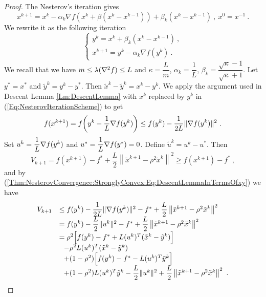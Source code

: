 \begin{proof} The Nesterov's iteration gives
$$x^{k+1} = x^k -
\alpha_k \nabla f
\left(x^k + \beta (x^k-x^{k-1})
\right)
+
\beta_k(x^k-x^{k-1}) \ , \ x^0=x^{-1} \ .
$$
We rewrite it as the following iteration
$$
\left\{\begin{array}{l}
y^k = x^k + \beta_k (x^k-x^{k-1}) \ , \\
x^{k+1} = y^k - \alpha_k \nabla f(y^k) \ .
\end{array}\right.
$$
We recall that we have $
m \le \lambda(\nabla^2 f) \le L$ and $\kappa = \dfrac{L}{m}$, $\alpha_k = \dfrac{1}{L}$, $\beta_k = \dfrac{\sqrt{\kappa}-1}{\sqrt{\kappa}+1}
$. Let $y^*=x^*$ and $\widetilde{y}^k= y^k-y^*$. Then $\widetilde{x}^k-\widetilde{y}^k=x^k-y^k$. We apply the argument used in Descent Lemma \ref{Lm:DescentLemma} with $x^k$ replaced by $y^k$ in (\ref{Eq:NesterovIterationScheme}) to get
\begin{equation}\label{Thm:NesterovConvergence:StronglyConvex:Eq:DescentLemmaInTermsOfxy}
f(x^{k+1}) = f\!\left(y^k - \frac{1}{L} \nabla f(y^k)\right)
\le f(y^k) - \frac{1}{2L}\|\nabla f(y^k)\|^2 \ .
\end{equation}
Set $
u^k = \dfrac{1}{L} \nabla f(y^k)$ and $
u^* = \dfrac{1}{L} \nabla f(y^*) = 0$. Define $\widetilde{u}^k=u^k-u^*$. Then 
$$V_{k+1}
=
f(x^{k+1}) - f^*
+
\frac{L}{2}
\left\|
\tilde{x}^{k+1} - \rho^2 \tilde{x}^k
\right\|^2
\ge
f(x^{k+1}) - f^* \ ,
$$
and by (\ref{Thm:NesterovConvergence:StronglyConvex:Eq:DescentLemmaInTermsOfxy}) we have
\begin{equation}\label{Thm:NesterovConvergence:StronglyConvex:Eq:BoundForVkplusOneSplitUsingrho}
\begin{array}{ll}
V_{k+1} & \le
f(y^k)
-
\dfrac{1}{2L}
\|\nabla f(y^k)\|^2
-
f^*
+
\dfrac{L}{2}
\left\|
\tilde{x}^{k+1} - \rho^2 \tilde{x}^k
\right\|^2
\\
& =
f(y^k)
-
\dfrac{L}{2}
\|u^k\|^2
-
f^*
+
\dfrac{L}{2}
\left\|
\tilde{x}^{k+1} - \rho^2 \tilde{x}^k
\right\|^2
\\
& =
\rho^2
\Big[
f(y^k)-f^*
+
L(u^k)^T(\tilde{x}^k-\tilde{y}^k)
\Big]
\\
& \ \ -\rho^2 L (u^k)^T(\tilde{x}^k-\tilde{y}^k)
\\
& \ \ +(1-\rho^2)
\Big[
f(y^k)-f^*
-
L(u^k)^T\tilde{y}^k
\Big]
\\
& \ \  +(1-\rho^2)L(u^k)^T \tilde{y}^k
-\dfrac{L}{2}\|u^k\|^2
+
\dfrac{L}{2}
\left\|
\tilde{x}^{k+1}-\rho^2\tilde{x}^k
\right\|^2 \ .
\end{array}
\end{equation}


\end{proof}
